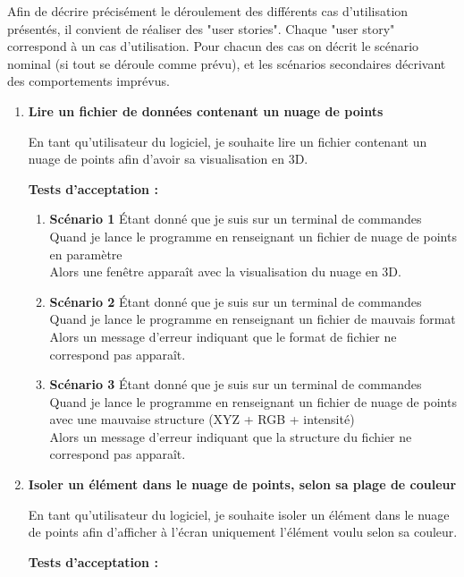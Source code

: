 \documentclass[12pt,titlepage,french]{article}
\begin{document}
Afin de décrire précisément le déroulement des différents cas d'utilisation présentés, il convient de réaliser des "user stories".
Chaque "user story" correspond à un cas d'utilisation.
Pour chacun des cas on décrit le scénario nominal (si tout se déroule comme prévu), et les scénarios secondaires décrivant des comportements imprévus.
\begin{enumerate}
    \item \textbf{Lire un fichier de données contenant un nuage de points}

En tant qu'utilisateur du logiciel, je souhaite lire un fichier contenant un nuage de points afin d'avoir sa visualisation en 3D.

\textbf{Tests d'acceptation :}

\begin{enumerate}
    \item \textbf{Scénario 1}
Étant donné que je suis sur un terminal de commandes\\
Quand je lance le programme en renseignant un fichier de nuage de points en paramètre\\
Alors une fenêtre apparaît avec la visualisation du nuage en 3D.

    \item \textbf{Scénario 2}
Étant donné que je suis sur un terminal de commandes\\
Quand je lance le programme en renseignant un fichier de mauvais format\\
Alors un message d'erreur indiquant que le format de fichier ne correspond pas apparaît.

    \item \textbf{Scénario 3}
Étant donné que je suis sur un terminal de commandes\\
Quand je lance le programme en renseignant un fichier de nuage de points avec une mauvaise structure (XYZ + RGB + intensité)\\
Alors un message d'erreur indiquant que la structure du fichier ne correspond pas apparaît.

\end{enumerate}

    \item \textbf{Isoler un élément dans le nuage de points, selon sa plage de couleur}

En tant qu'utilisateur du logiciel, je souhaite isoler un élément dans le nuage de points afin d'afficher à l'écran uniquement l'élément voulu selon sa couleur.

\textbf{Tests d'acceptation :}


\end{enumerate}
\end{document}
